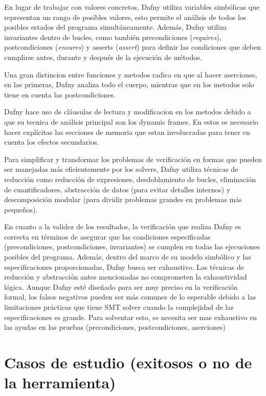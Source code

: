 \documentclass[runningheads]{llncs}
\begin{document}
En lugar de trabajar con valores concretos, Dafny utiliza variables simbólicas que representan un rango de posibles valores,
esto permite el análisis de todos los posibles estados del programa simultáneamente.
Además, Dafny utiliza invariantes dentro de bucles, como también precondiciones (\textit{requires}), postcondiciones (\textit{ensures}) y asserts (\textit{assert}) para definir las condiciones 
que deben cumplirse antes, durante y después de la ejecución de métodos.

Una gran distincion entre funciones y metodos radica en que al hacer aserciones, en las primeras, Dafny analiza todo el cuerpo, mientras que en los metodos solo tiene en cuenta las postcondiciones. 

Dafny hace uso de cláusulas de lectura y modificacion en los metodos debido a que su tecnica de análisis principal son los dynamic frames. En estos es necesario hacer explícitas las secciones de memoria
que estan involucradas para tener en cuenta los efectos secundarios.

Para simplificar y transformar los problemas de verificación en formas que pueden ser manejadas más eficientemente por los solvers, 
Dafny utiliza técnicas de reducción como reducción de expresiones, desdoblamiento de bucles, eliminación de cuantificadores,
abstracción de datos (para evitar detalles internos) y descomposición modular (para dividir problemas grandes en problemas más pequeños).

En cuanto a la validez de los resultados, la verificación que realiza Dafny es correcta en términos de asegurar que las condiciones
especificadas (precondiciones, postcondiciones, invariantes) se cumplen en todas las ejecuciones posibles del programa. 
Además, dentro del marco de su modelo simbólico y las especificaciones proporcionadas,
Dafny busca ser exhaustivo. Las técnicas de reducción y abstracción antes mencionadas no comprometen la exhaustividad lógica.
Aunque Dafny esté diseñado para ser muy preciso en la verificación formal, 
los falsos negativos pueden ser más comunes de lo esperable debido a las limitaciones prácticas que tiene SMT solver
cuando la complejidad de las especificaciones es grande. Para solventar esto, se necesita ser mas exhaustivo en las ayudas en las pruebas (precondiciones, postcondiciones, aserciones)

\section{Casos de estudio (exitosos o no de la herramienta)}
\end{document}
